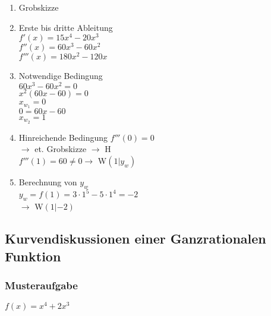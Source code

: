 \begin{multicols}{2}
\begin{enumerate}
    \item Grobskizze\\
    \item Erste bis dritte Ableitung\\
    $f'(x)=15x^4-20x^3$\\
    $f''(x)=60x^3-60x^2$\\
    $f'''(x)=180x^2-120x$
    \item Notwendige Bedingung\\
    $60x^3-60x^2=0$\\
    $x^2(60x-60)=0$\\
    $x_{w_1}=0$\\
    $0=60x-60$\\
    $x_{w_2}=1$
    \item Hinreichende Bedingung
    $f'''(0)=0$\\$\rightarrow $ et. Grobskizze $\rightarrow$ H\\
    $f'''(1)=60\neq 0\rightarrow$ W$(1|y_w)$
    \item Berechnung von $y_w$\\
    $y_w=f(1)=3\cdot 1^5-5\cdot 1^4=-2$\\$\rightarrow$ W$(1|-2)$
\end{enumerate}
\end{multicols}

\subsection{Kurvendiskussionen einer Ganzrationalen Funktion}
\subsubsection{Musteraufgabe}
$f(x)=x^4+2x^3$

